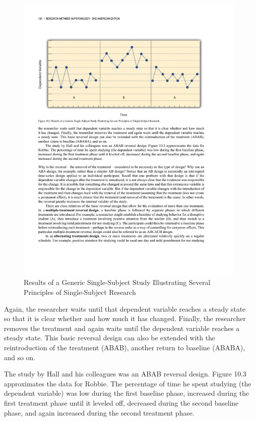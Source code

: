 \begin{figure}

\includegraphics[width=\linewidth]{figures/C10reverse.pdf}
\caption{Results of a Generic Single-Subject Study Illustrating Several Principles of Single-Subject Research
  }
\label{fig:reverse}

\end{figure}

Again,
the researcher waits until that dependent variable reaches a steady state so that it is clear whether and how much it has changed. Finally, the researcher removes the treatment and again waits until the dependent variable reaches a steady state. This basic reversal design can also be extended with the reintroduction of the treatment (ABAB), another return to baseline (ABABA), and so on.

The study by Hall and his colleagues was an ABAB reversal design. Figure 10.3 approximates the data for Robbie. The percentage of time he spent studying (the dependent variable) was low during the first baseline phase, increased during the first treatment phase until it leveled off, decreased during the second baseline phase, and again increased during the second treatment phase.

